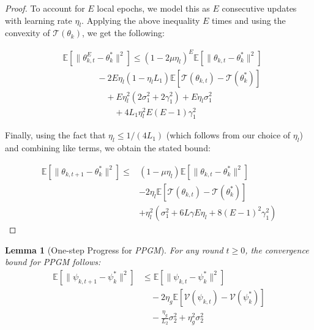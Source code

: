 \documentclass[lettersize,journal]{IEEEtran}
\newtheorem{lemma}{Lemma}
\newtheorem{proof}{Proof}
\begin{document}
\begin{proof}
To account for $E$ local epochs, we model this as $E$ consecutive updates with learning rate $\eta_l$. Applying the above inequality $E$ times and using the convexity of $\mathcal{T}(\theta_k)$, we get the following:

\begin{align*}
&\mathbb{E}[\|\theta_{k,t}^E - \theta_k^*\|^2] \leq (1 - 2\mu\eta_l)^E\mathbb{E}[\|\theta_{k,t} - \theta_k^*\|^2]\\ 
& \qquad \qquad - 2E\eta_l(1 - \eta_l L_1)\mathbb{E}[\mathcal{T}(\theta_{k,t}) - \mathcal{T}(\theta_k^*)] \\
&\qquad \qquad \quad + E\eta_l^2(2\sigma_1^2 + 2\gamma_1^2) + E\eta_l\sigma_1^2\\ 
&\qquad \qquad \qquad + 4L_1\eta_l^2E(E-1)\gamma_1^2
\end{align*}


Finally, using the fact that $\eta_l \leq 1/(4L_1)$ (which follows from our choice of $\eta_l$) and combining like terms, we obtain the stated bound:

\begin{equation}
\begin{split}
\mathbb{E}[\|\theta_{k,t+1} - \theta_k^*\|^2] \leq& (1-\mu\eta_l)\mathbb{E}[\|\theta_{k,t} - \theta_k^*\|^2]\\ 
&- 2\eta_l\mathbb{E}[\mathcal{T}(\theta_{k,t}) - \mathcal{T}(\theta_k^*)] \\
&+ \eta_l^2(\sigma_1^2 + 6L\gamma E\eta_l + 8(E-1)^2\gamma_1^2)
\end{split}
\end{equation}

\end{proof}

\begin{lemma}[One-step Progress for \emph{PPGM}]
\label{lemma:2}
For any round $t \geq 0$, the convergence bound for \emph{PPGM} follows:
\begin{equation}
\begin{split}
    \mathbb{E}[\|\psi_{k,t+1} - \psi_k^*\|^2]
    &\leq \mathbb{E}[\|\psi_{k,t} - \psi_k^*\|^2]\\
    &\quad - 2\eta_g \mathbb{E}[\mathcal{V}(\psi_{k,t}) - \mathcal{V}(\psi_k^*)] \\
    &\quad - \frac{\eta_g}{L_2} \sigma_2^2 + \eta_g^2 \sigma_2^2
\end{split}
\end{equation}
\end{lemma}
\end{document}

